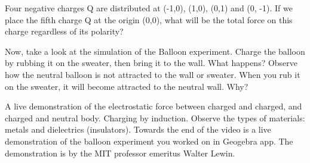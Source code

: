 \documentclass{ximera}
\begin{document}
\begin{question}  
  Four negative charges Q are distributed at (-1,0), (1,0), (0,1) and (0, -1). If we place the fifth charge Q at the origin (0,0), what will be the total force on this charge regardless of its polarity?
  \begin{multipleChoice}  
  \end{multipleChoice}  
\end{question}



Now, take a look at the simulation of the Balloon experiment. Charge the balloon by rubbing it on the sweater, then bring it to the wall. What happens? Observe how the neutral balloon is not attracted to the wall or sweater. When you rub it on the sweater, it will become attracted to the neutral wall. Why?

\begin{center}  
\end{center} 

 A live demonstration of the electrostatic force between charged and charged, and charged and neutral body. Charging by induction.  Observe the types of materials: metals and dielectrics (insulators). Towards the end of the video is a live demonstration of the balloon experiment you worked on in Geogebra app. The demonstration is by
 the MIT professor emeritus Walter Lewin.

 \begin{center}
 \end{center}
\end{document}
